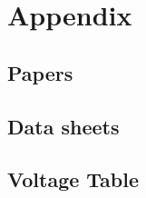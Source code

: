 \appendix
	
\section{Appendix}
	\subsection{Papers}
	
	
	
	\subsection{Data sheets} \label{sec:appendix}
	

	\subsection{Voltage Table} \label{VoltageSet}
	
